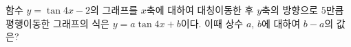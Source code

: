 함수 $y=\tan 4x-2$의 그래프를 $x$축에 대하여 대칭이동한 후 $y$축의 방향으로 $5$만큼 평행이동한 그래프의 식은 $y=a\tan 4x+b$이다. 이때 상수 $a$, $b$에 대하여 $b-a$의 값은?
